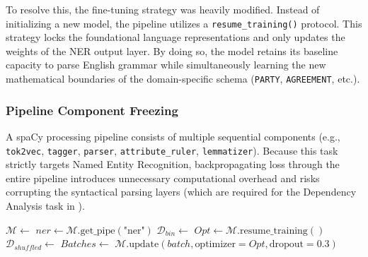 \documentclass[twoside,final]{hcmut-report}
\newcommand{\result}[1]{\fcolorbox{red}{white}{#1}}
\begin{document}
\medskip

To resolve this, the fine-tuning strategy was heavily modified. Instead of initializing a new model, the pipeline utilizes a \texttt{resume\_training()} protocol. This strategy locks the foundational language representations and only updates the weights of the NER output layer. By doing so, the model retains its baseline capacity to parse English grammar while simultaneously learning the new mathematical boundaries of the domain-specific schema (\texttt{PARTY}, \texttt{AGREEMENT}, etc.).

\subsubsection*{Pipeline Component Freezing}
A spaCy processing pipeline consists of multiple sequential components (e.g., \texttt{tok2vec}, \texttt{tagger}, \texttt{parser}, \texttt{attribute\_ruler}, \texttt{lemmatizer}). Because this task strictly targets Named Entity Recognition, backpropagating loss through the entire pipeline introduces unnecessary computational overhead and risks corrupting the syntactical parsing layers (which are required for the Dependency Analysis task in \result{Section~\ref{task_1.3}}).

\begin{algorithm}[H]
  \footnotesize
  \caption{Domain-Specific NER Fine-Tuning and Optimization}
  \begin{algorithmic}[1]
    \State $\mathcal{M} \leftarrow$  
    \State $ner \leftarrow \mathcal{M}.\text{get\_pipe}(\text{"ner"})$
     
    \State {}
    \EndFor
    \State $\mathcal{D}_{bin} \leftarrow$  
    \State $Opt \leftarrow \mathcal{M}.\text{resume\_training}()$ 
    \State {} 
    \State $\mathcal{D}_{shuffled} \gets$ 
    \State $Batches \gets$ 
    \State $\mathcal{M}.\text{update}(batch, \text{optimizer}=Opt, \text{dropout}=0.3)$
    \EndFor
    \EndFor
    \State {}
    \EndProcedure
  \end{algorithmic}
\end{algorithm}
\end{document}
